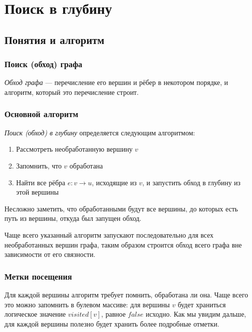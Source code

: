 \documentclass[a4paper,12pt]{article}
\begin{document}
  \section{Поиск в глубину}

    \subsection{Понятия и алгоритм}

      \subsubsection{Поиск (обход) графа}

      \emph{Обход графа} --- перечисление его вершин и рёбер
      в некотором порядке, и алгоритм, который это перечисление
      строит.

      \subsubsection{Основной алгоритм}

      \emph{Поиск (обход) в глубину} определяется следующим
      алгоритмом:
      \begin{enumerate}
        \item Рассмотреть необработанную вершину $v$
        \item Запомнить, что $v$ обработана
        \item Найти все рёбра $e: v \to u$, исходящие из $v$,
          и запустить обход в глубину из этой вершины
      \end{enumerate}

      Несложно заметить, что обработанными будут все вершины,
      до которых есть путь из вершины, откуда был запущен обход.

      Чаще всего указанный алгоритм запускают последовательно
      для всех необработанных вершин графа, таким образом строится
      обход всего графа вне зависимости от его связности.

      \subsubsection{Метки посещения}

      Для каждой вершины алгоритм требует помнить, обработана ли она.
      Чаще всего это можно запомнить в булевом массиве: для
      вершины $v$ будет храниться логическое значение $visited[v]$,
      равное $false$ исходно. Как мы увидим дальше, для каждой вершины
      полезно будет хранить более подробные отметки.
\end{document}
